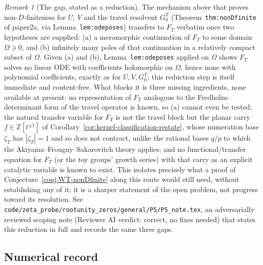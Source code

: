 \documentclass[11pt]{article}
\theoremstyle{plain}
\theoremstyle{definition}
\theoremstyle{remark}
\newtheorem{remark}[theorem]{Remark}
\newcommand{\Z}{\mathbb{Z}}
\begin{document}
\begin{remark}[The gap, stated as a reduction]
\label{rem:WT-nonDfinite-reduction}
The mechanism above that proves non-$D$-finiteness for $U$, $V$ and the travel
resolvent $G^T_0$ (Theorem~\texttt{thm:nonDfinite} of paper2a, via
Lemma~\texttt{lem:odeposes}) transfers to $F_T$ verbatim once two hypotheses are
supplied: (a) a meromorphic continuation of $F_T$ to some domain $\Omega\ni0$,
and (b) infinitely many poles of that continuation in a relatively compact
subset of $\Omega$. Given (a) and (b), Lemma~\texttt{lem:odeposes} applied on
$\Omega$ shows $F_T$ solves no linear ODE with coefficients holomorphic on
$\Omega$, hence none with polynomial coefficients, exactly as for $U,V,G^T_0$;
this reduction step is itself immediate and content-free. What blocks it is
three missing ingredients, none available at present: no representation of
$F_T$ analogous to the Fredholm-determinant form of the travel operator is
known, so (a) cannot even be tested; the natural transfer variable for $F_T$ is
not the travel block but the planar carry $f\in\Z[t^{\pm1}]$ of
Corollary~\ref{cor:kernel-classification-restate}, whose numeration base
$\zeta_T$ has $|\zeta_T|=1$ and so does not contract, unlike the rational bases
$q/p$ to which the Akiyama--Frougny--Sakarovitch theory applies; and no
functional/transfer equation for $F_T$ (or the toy groups' growth series) with
that carry as an explicit catalytic variable is known to exist. This isolates
precisely what a proof of Conjecture~\ref{conj:WT-nonDfinite} along this route
would still need, without establishing any of it; it is a sharper statement of
the open problem, not progress toward its resolution. See
\texttt{code/zeta\_probe/rootunity\_zeros/general/P5/P5\_note.tex}, an
adversarially reviewed scoping note (Reviewer AI verdict: correct, no fixes
needed) that states this reduction in full and records the same three gaps.
\end{remark}

\subsection{Numerical record}
\end{document}
